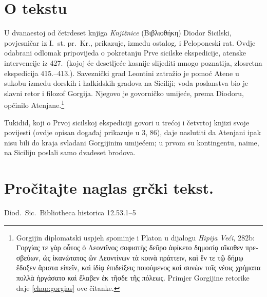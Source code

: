 

\section*{O tekstu}

U dvanaestoj od četrdeset knjiga \textit{Knjižnice} \textgreek{(Βιβλιοθήκη)} Diodor Sicilski, povjesničar iz I.~st. pr.~Kr., prikazuje, između ostalog, i Peloponeski rat. Ovdje odabrani odlomak pripovijeda o pokretanju Prve sicilske ekspedicije, atenske intervencije iz 427.\ (kojoj će desetljeće kasnije slijediti mnogo poznatija, zlosretna ekspedicija 415.–413.). Saveznički grad Leontini zatražio je pomoć Atene u sukobu između dorskih i halkidskih gradova na Siciliji; vođa poslanstva bio je slavni retor i filozof Gorgija. Njegovo je govorničko umijeće, prema Diodoru, opčinilo Atenjane.\footnote{Gorgijin diplomatski uspjeh spominje i Platon u dijalogu \textit{Hipija Veći,} 282b: \textgreek{Γοργίας τε γὰρ οὗτος ὁ Λεοντῖνος σοφιστὴς δεῦρο ἀφίκετο δημοσίᾳ οἴκοθεν πρεσβεύων, ὡς ἱκανώτατος ὢν Λεοντίνων τὰ κοινὰ πράττειν, καὶ ἔν τε τῷ δήμῳ ἔδοξεν ἄριστα εἰπεῖν, καὶ ἰδίᾳ ἐπιδείξεις ποιούμενος καὶ συνὼν τοῖς νέοις χρήματα πολλὰ ἠργάσατο καὶ ἔλαβεν ἐκ τῆσδε τῆς πόλεως.} Primjer Gorgijine retorike daje \autoref{chap:gorgias} ove čitanke.}

Tukidid, koji o Prvoj sicilskoj ekspediciji govori u trećoj i četvrtoj knjizi svoje povijesti (ovdje opisan događaj prikazuje u 3, 86), daje naslutiti da Atenjani ipak nisu bili do kraja svladani Gorgijinim umijećem; u prvom su kontingentu, naime, na Siciliju poslali samo dvadeset brodova.


\section*{Pročitajte naglas grčki tekst.}

Diod.~Sic.\ Bibliotheca historica 12.53.1–5


\medskip


